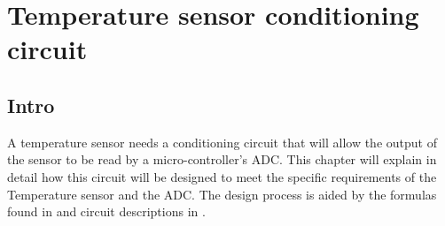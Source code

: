 \chapter{Temperature sensor conditioning circuit}\label{sec:temp_sensor}

\section{Intro} \label{sec:temp_intro_ch3}
A temperature sensor needs a conditioning circuit that will allow the output of the sensor to be read by a micro-controller's ADC. This chapter will explain in detail how this circuit will be designed to meet the specific requirements of the Temperature sensor and the ADC. The design process is aided by the formulas found in \cite{Carter2002} and circuit descriptions in \cite{WebsiteOpAmp}.

